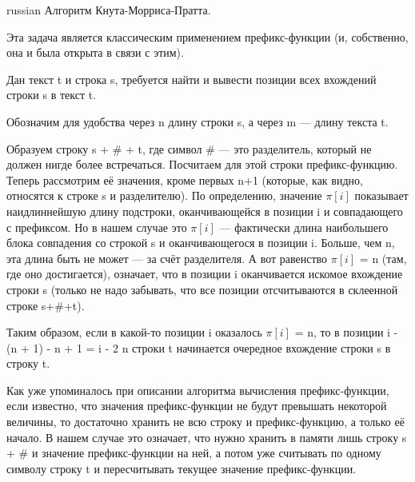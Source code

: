\documentclass{article}
\begin{document}
\begin{otherlanguage*}{russian}
    Алгоритм Кнута-Морриса-Пратта.

    Эта задача является классическим применением префикс-функции (и, собственно, она и была открыта в связи с этим).

    Дан текст t и строка s, требуется найти и вывести позиции всех вхождений строки s в текст t.

    Обозначим для удобства через n длину строки s, а через m — длину текста t.

    Образуем строку s + \# + t, где символ \# — это разделитель, который не должен нигде более встречаться. Посчитаем для этой строки префикс-функцию. Теперь рассмотрим её значения, кроме первых n+1 (которые, как видно, относятся к строке s и разделителю). По определению, значение $\pi[i]$ показывает наидлиннейшую длину подстроки, оканчивающейся в позиции i и совпадающего с префиксом. Но в нашем случае это $\pi[i]$ — фактически длина наибольшего блока совпадения со строкой s и оканчивающегося в позиции i. Больше, чем n, эта длина быть не может — за счёт разделителя. А вот равенство $\pi[i]$ = n (там, где оно достигается), означает, что в позиции i оканчивается искомое вхождение строки s (только не надо забывать, что все позиции отсчитываются в склеенной строке s+\#+t).

    Таким образом, если в какой-то позиции i оказалось $\pi[i]$ = n, то в позиции i - (n + 1) - n + 1 = i - 2 n строки t начинается очередное вхождение строки s в строку t.

    Как уже упоминалось при описании алгоритма вычисления префикс-функции, если известно, что значения префикс-функции не будут превышать некоторой величины, то достаточно хранить не всю строку и префикс-функцию, а только её начало. В нашем случае это означает, что нужно хранить в памяти лишь строку s + \# и значение префикс-функции на ней, а потом уже считывать по одному символу строку t и пересчитывать текущее значение префикс-функции.
\end{otherlanguage*}
\end{document}
